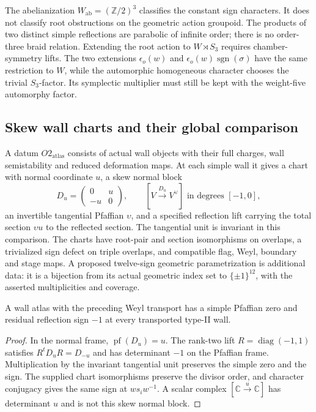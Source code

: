 \begin{remark}
\label{rem:G-O1-plus-reduction}
The abelianization \(W_{\mathrm{ab}}=(\mathbb Z/2)^3\)
classifies the constant sign characters. It does not classify root
obstructions on the geometric action groupoid. The products of two
distinct simple reflections are parabolic of infinite order; there
is no order-three braid relation. Extending the root action to
\(W\rtimes S_3\) requires chamber-symmetry lifts. The two
extensions \(\epsilon_o(w)\) and
\(\epsilon_o(w)\operatorname{sgn}(\sigma)\) have the same
restriction to \(W\), while the automorphic homogeneous character
chooses the trivial \(S_3\)-factor. Its symplectic multiplier
must still be kept with the weight-five automorphy factor.
\end{remark}

\subsection{Skew wall charts and their global comparison}
\label{app:G-O2-discharge}

\begin{definition}
\label{def:G-O2-atlas}
A datum \(O2_{\mathrm{atlas}}\) consists of actual wall objects
with their full charges, wall semistability and reduced deformation
maps. At each simple wall it gives a chart with normal coordinate
\(u\), a skew normal block
\[
 D_u=\begin{pmatrix}0&u\\-u&0\end{pmatrix},
 \qquad [V\xrightarrow{D_u}V^\vee]\text{ in degrees }[-1,0],
\]
an invertible tangential Pfaffian \(\upsilon\), and a specified
reflection lift carrying the total section
\(\upsilon u\) to the reflected section. The tangential unit is
invariant in this comparison. The charts have root-pair and
section isomorphisms on overlaps, a trivialized sign defect on
triple overlaps, and compatible flag, Weyl, boundary and stage maps.
A proposed twelve-sign geometric parametrization is additional
data: it is a bijection from its actual geometric index set to
\(\{\pm1\}^{12}\), with the asserted multiplicities and coverage.
\end{definition}

\begin{theorem}
\label{thm:G-O2-normal-form}
A wall atlas with the preceding Weyl transport has a simple
Pfaffian zero and residual reflection sign \(-1\) at every
transported type-II wall.
\end{theorem}
\begin{proof}
In the normal frame, \(\operatorname{pf}(D_u)=u\).
The rank-two lift \(R=\operatorname{diag}(-1,1)\) satisfies
\(R^tD_uR=D_{-u}\) and has determinant \(-1\) on the
Pfaffian frame. Multiplication by the invariant tangential unit
preserves the simple zero and the sign. The supplied chart
isomorphisms preserve the divisor order, and character conjugacy
gives the same sign at \(ws_iw^{-1}\). A scalar complex
\([\mathbb C\xrightarrow{u}\mathbb C]\) has determinant \(u\)
and is not this skew normal block.
\end{proof}

